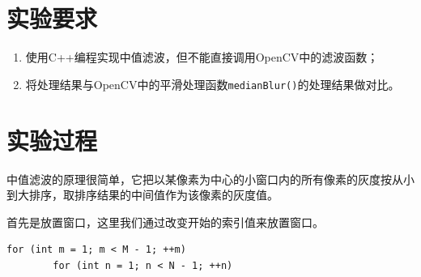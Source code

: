 \documentclass[a4paper]{ctexrep}
\begin{document}
\section{实验要求}
\begin{enumerate}
\item 使用C++编程实现中值滤波，但不能直接调用OpenCV中的滤波函数；
\item 将处理结果与OpenCV中的平滑处理函数\lstinline{medianBlur()}的处理结果做对比。
\end{enumerate}

\section{实验过程}

中值滤波的原理很简单，它把以某像素为中心的小窗口内的所有像素的灰度按从小到大排序，取排序结果的中间值作为该像素的灰度值。

首先是放置窗口，这里我们通过改变开始的索引值来放置窗口。

\begin{lstlisting}
for (int m = 1; m < M - 1; ++m)
		for (int n = 1; n < N - 1; ++n)
\end{lstlisting}
\end{document}

